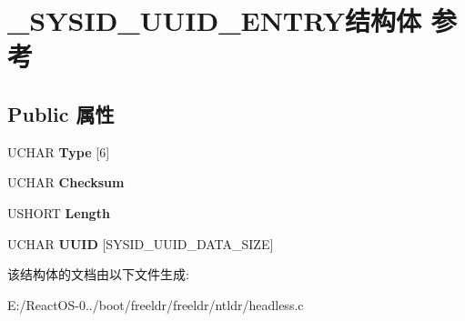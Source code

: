 \hypertarget{struct___s_y_s_i_d___u_u_i_d___e_n_t_r_y}{}\section{\+\_\+\+S\+Y\+S\+I\+D\+\_\+\+U\+U\+I\+D\+\_\+\+E\+N\+T\+R\+Y结构体 参考}
\label{struct___s_y_s_i_d___u_u_i_d___e_n_t_r_y}
\subsection*{Public 属性}
\begin{DoxyCompactItemize}
\item 
\mbox{\label{struct___s_y_s_i_d___u_u_i_d___e_n_t_r_y_a5d354aa501a23c4e3b8ca375227657dc}} 
U\+C\+H\+AR {\bfseries Type} \mbox{[}6\mbox{]}
\item 
\mbox{\label{struct___s_y_s_i_d___u_u_i_d___e_n_t_r_y_a3740fe8c8d40cc5308220e74f73a9987}} 
U\+C\+H\+AR {\bfseries Checksum}
\item 
\mbox{\label{struct___s_y_s_i_d___u_u_i_d___e_n_t_r_y_a5cc622944a92e8526aaaf0aaab74347b}} 
U\+S\+H\+O\+RT {\bfseries Length}
\item 
\mbox{\label{struct___s_y_s_i_d___u_u_i_d___e_n_t_r_y_a4a2e83b47c7823225010a75b4360d899}} 
U\+C\+H\+AR {\bfseries U\+U\+ID} \mbox{[}S\+Y\+S\+I\+D\+\_\+\+U\+U\+I\+D\+\_\+\+D\+A\+T\+A\+\_\+\+S\+I\+ZE\mbox{]}
\end{DoxyCompactItemize}


该结构体的文档由以下文件生成\+:\begin{DoxyCompactItemize}
\item 
E\+:/\+React\+O\+S-\/0../boot/freeldr/freeldr/ntldr/headless.\+c\end{DoxyCompactItemize}
